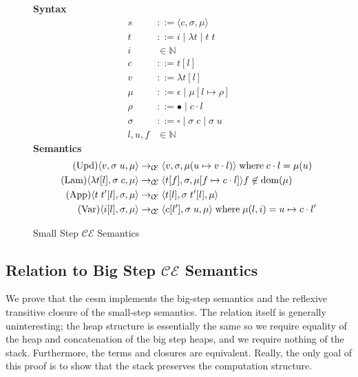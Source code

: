 \begin{figure*}
\textbf{Syntax}
\begin{align*}
\tag{State} s &::= \langle c, \sigma, \mu \rangle \\
\tag{Term} t &::= i \; | \; \lambda t \; | \; t \; t  \\
\tag{Variable} i &\in \mathbb{N}  \\
\tag{Closure} c &::= t [l] \\
\tag{Value} v &::= \lambda t[l] \\
\tag{Heap} \mu &::= \epsilon \; | \; \mu [ l \mapsto \rho ] \\
\tag{Environment} \rho &::= \bullet \; | \; c \cdot l \\
\tag{Context} \sigma &::= \square \; | \; \sigma \; c \;  | \; \sigma \; u \\
\tag{Location} l,u,f &\in \mathbb{N}
\end{align*}
\textbf{Semantics}
\begin{align*}
\tag{Upd}
\langle v,  \sigma \; u , \mu \rangle 
  &\rightarrow_{\mathcal{\mathcal{C} \mskip -4mu \mathcal{E}}}
\langle v, \sigma, \mu(u \mapsto v \cdot l) \rangle  
\; \textnormal{where} \; c \cdot l = \mu(u) \\
\tag{Lam}
\langle \lambda t[l], \sigma \; c, \mu \rangle 
  &\rightarrow_{\mathcal{\mathcal{C} \mskip -4mu \mathcal{E}}}
\langle t[f], \sigma, \mu[f \mapsto c \cdot l]\rangle f \not \in \textnormal{dom}(\mu)  \\
\tag{App}
\langle t \; t'[l], \sigma, \mu \rangle
  &\rightarrow_{\mathcal{\mathcal{C} \mskip -4mu \mathcal{E}}}
\langle t[l], \sigma \; t'[l], \mu \rangle \\
\tag{Var}
\langle i[l], \sigma, \mu \rangle
  &\rightarrow_{\mathcal{\mathcal{C} \mskip -4mu \mathcal{E}}}
\langle c[l'], \sigma \; u, \mu \rangle
\; \textnormal{where} \; \mu(l, i) = u \mapsto c \cdot l'
\end{align*}
\caption{Small Step $\mathcal{CE}$ Semantics}
\label{fig:cesm}
\end{figure*}

\subsection{Relation to Big Step $\mathcal{CE}$ Semantics}

We prove that the cesm implements the big-step semantics and the reflexive
transitive closure of the small-step semantics. The relation itself is generally
uninteresting; the heap structure is essentially the same so we require equality
of the heap and concatenation of the big step heaps, and we require nothing of
the stack. Furthermore, the terms and closures are equivalent. Really, the only
goal of this proof is to show that the stack preserves the computation
structure.  

